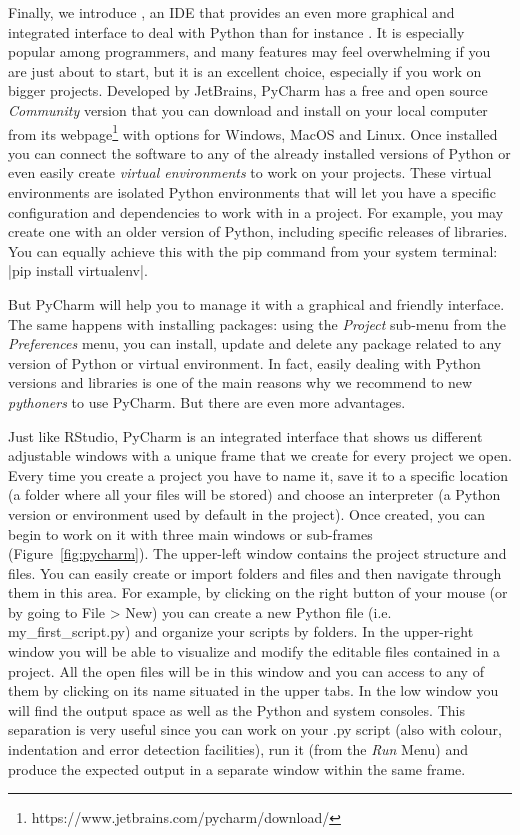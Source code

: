 Finally, we introduce , an IDE that provides an even more
graphical and integrated interface to deal with Python than for
instance . It is especially popular among programmers, and
many features may feel overwhelming if you are just about to start,
but it is an excellent choice, especially if you work on bigger projects.
Developed by JetBrains, PyCharm has a free and
open source \emph{Community} version that you can download and install
on your local computer from its
webpage\footnote{https://www.jetbrains.com/pycharm/download/} with
options for Windows, MacOS and Linux. Once installed you can connect
the software to any of the already installed versions of Python or
even easily create \emph{virtual environments} to work on your
projects. These virtual environments are isolated Python environments
that will let you have a specific configuration and dependencies to
work with in a project. For example, you may create one with an older
version of Python, including specific releases of libraries.  You can
equally achieve this with the pip command from your system terminal:
|pip install virtualenv|.
 
But PyCharm will help you to manage it with a graphical and friendly
interface. The same happens with installing packages: using the
\emph{Project} sub-menu from the \emph{Preferences} menu, you can
install, update and delete any package related to any version of
Python or virtual environment. In fact, easily dealing with Python
versions and libraries is one of the main reasons why we recommend to
new \emph{pythoners} to use PyCharm. But there are even more
advantages.

Just like RStudio, PyCharm is an integrated interface that shows us
different adjustable windows with a unique frame that we create for
every project we open. Every time you create a project you have to
name it, save it to a specific location (a folder where all your files
will be stored) and choose an interpreter (a Python version or
environment used by default in the project). Once created, you can
begin to work on it with three main windows or sub-frames
(Figure~\ref{fig:pycharm}). The upper-left window contains the project
structure and files. You can easily create or import folders and files
and then navigate through them in this area. For example, by clicking
on the right button of your mouse (or by going to File \textgreater
New) you can create a new Python file (i.e. my\_first\_script.py) and
organize your scripts by folders. In the upper-right window you will
be able to visualize and modify the editable files contained in a
project. All the open files will be in this window and you can access
to any of them by clicking on its name situated in the upper tabs. In
the low window you will find the output space as well as the Python
and system consoles. This separation is very useful since you can work
on your .py script (also with colour, indentation and error detection
facilities), run it (from the \emph{Run} Menu) and produce the
expected output in a separate window within the same frame.

